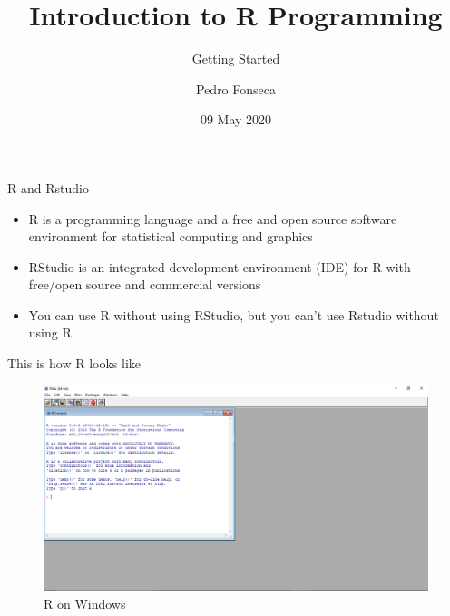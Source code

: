 \documentclass[ignorenonframetext,]{beamer}
\title{Introduction to R Programming}
\subtitle{Getting Started}
\author{Pedro Fonseca}
\date{09 May 2020}
\begin{document}
\frame{\titlepage}

\begin{frame}{R and Rstudio}
\protect\hypertarget{r-and-rstudio}{}

\begin{itemize}
\item
  R is a programming language and a free and open source software
  environment for statistical computing and graphics
\item
  RStudio is an integrated development environment (IDE) for R with
  free/open source and commercial versions
\item
  You can use R without using RStudio, but you can't use Rstudio without
  using R
\end{itemize}

\end{frame}

\begin{frame}{This is how R looks like}
\protect\hypertarget{this-is-how-r-looks-like}{}

\begin{figure}
\includegraphics[scale = .3]{figures/Screenshot_1}
\caption{R on Windows}
\end{figure}

\end{frame}
\end{document}
